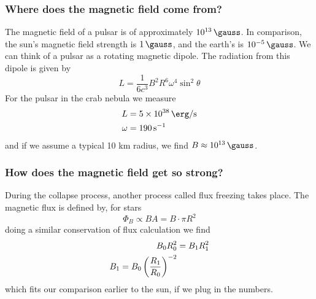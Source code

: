 \subsubsection{Where does the magnetic field come from?}
The magnetic field of a pulsar is of approximately \(\qty{e13}{\gauss}\). In comparison, the sun's magnetic field strength is \(\qty{1}{\gauss}\), and the earth's is \(\qty{e-5}{\gauss}\). We can think of a pulsar as a rotating magnetic dipole.
The radiation from this dipole is given by
\begin{equation}
    L = \frac{1}{6c^3}B^2R^6\omega^4\sin^2\theta
\end{equation}
For the pulsar in the crab nebula we measure
\begin{align}
    L &= \qty{5e38}{\erg\per\second} \\
    \omega &= \qty{190}{\per\second}
\end{align}
and if we assume a typical 10 km radius, we find \(B\approx\qty{e13}{\gauss}\).
\subsubsection{How does the magnetic field get so strong?}
During the collapse process, another process called flux freezing takes place. The magnetic flux is defined by, for stars
\begin{equation}
    \Phi_B \propto BA = B\cdot\pi R^2
\end{equation}
doing a similar conservation of flux calculation we find
\begin{align}
    B_0R_0^2 &= B_1R_1^2 \\
    B_1 = B_0 \left(\frac{R_1}{R_0}\right)^{-2}
\end{align}
which fits our comparison earlier to the sun, if we plug in the numbers. 

